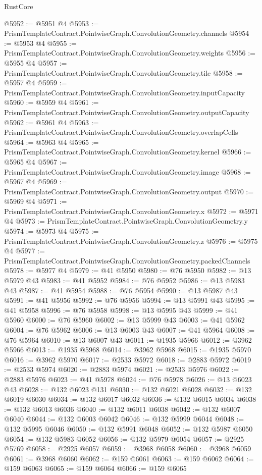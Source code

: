 \begin{lexlean}{RustCore}
\begin{coremodule}
@5952 := @5951 @4
@5953 := PrismTemplateContract.PointwiseGraph.ConvolutionGeometry.channels
@5954 := @5953 @4
@5955 := PrismTemplateContract.PointwiseGraph.ConvolutionGeometry.weights
@5956 := @5955 @4
@5957 := PrismTemplateContract.PointwiseGraph.ConvolutionGeometry.tile
@5958 := @5957 @4
@5959 := PrismTemplateContract.PointwiseGraph.ConvolutionGeometry.inputCapacity
@5960 := @5959 @4
@5961 := PrismTemplateContract.PointwiseGraph.ConvolutionGeometry.outputCapacity
@5962 := @5961 @4
@5963 := PrismTemplateContract.PointwiseGraph.ConvolutionGeometry.overlapCells
@5964 := @5963 @4
@5965 := PrismTemplateContract.PointwiseGraph.ConvolutionGeometry.kernel
@5966 := @5965 @4
@5967 := PrismTemplateContract.PointwiseGraph.ConvolutionGeometry.image
@5968 := @5967 @4
@5969 := PrismTemplateContract.PointwiseGraph.ConvolutionGeometry.output
@5970 := @5969 @4
@5971 := PrismTemplateContract.PointwiseGraph.ConvolutionGeometry.x
@5972 := @5971 @4
@5973 := PrismTemplateContract.PointwiseGraph.ConvolutionGeometry.y
@5974 := @5973 @4
@5975 := PrismTemplateContract.PointwiseGraph.ConvolutionGeometry.z
@5976 := @5975 @4
@5977 := PrismTemplateContract.PointwiseGraph.ConvolutionGeometry.packedChannels
@5978 := @5977 @4
@5979 := @41 @5950
@5980 := @76 @5950
@5982 := @13 @5979 @43
@5983 := @41 @5952
@5984 := @76 @5952
@5986 := @13 @5983 @43
@5987 := @41 @5954
@5988 := @76 @5954
@5990 := @13 @5987 @43
@5991 := @41 @5956
@5992 := @76 @5956
@5994 := @13 @5991 @43
@5995 := @41 @5958
@5996 := @76 @5958
@5998 := @13 @5995 @43
@5999 := @41 @5960
@6000 := @76 @5960
@6002 := @13 @5999 @43
@6003 := @41 @5962
@6004 := @76 @5962
@6006 := @13 @6003 @43
@6007 := @41 @5964
@6008 := @76 @5964
@6010 := @13 @6007 @43
@6011 := @1935 @5966
@6012 := @3962 @5966
@6013 := @1935 @5968
@6014 := @3962 @5968
@6015 := @1935 @5970
@6016 := @3962 @5970
@6017 := @2533 @5972
@6018 := @2883 @5972
@6019 := @2533 @5974
@6020 := @2883 @5974
@6021 := @2533 @5976
@6022 := @2883 @5976
@6023 := @41 @5978
@6024 := @76 @5978
@6026 := @13 @6023 @43
@6028 := @132 @6023 @131
@6030 := @132 @6021 @6028
@6032 := @132 @6019 @6030
@6034 := @132 @6017 @6032
@6036 := @132 @6015 @6034
@6038 := @132 @6013 @6036
@6040 := @132 @6011 @6038
@6042 := @132 @6007 @6040
@6044 := @132 @6003 @6042
@6046 := @132 @5999 @6044
@6048 := @132 @5995 @6046
@6050 := @132 @5991 @6048
@6052 := @132 @5987 @6050
@6054 := @132 @5983 @6052
@6056 := @132 @5979 @6054
@6057 := @2925 @5769
@6058 := @2925 @6057
@6059 := @3968 @6058
@6060 := @3968 @6059
@6061 := @3968 @6060
@6062 := @159 @6061
@6063 := @159 @6062
@6064 := @159 @6063
@6065 := @159 @6064
@6066 := @159 @6065

\end{coremodule}
\end{lexlean}
